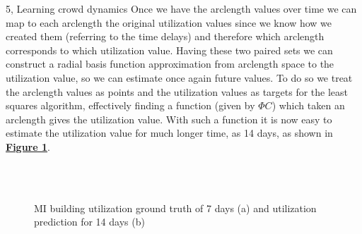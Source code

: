 \documentclass[10pt,a4paper]{article}
\begin{document}
\begin{task}{5, Learning crowd dynamics}
Once we have the arclength values over time we can map to each arclength the original utilization values since we know how we created them (referring to the time delays) and therefore which arclength corresponds to which utilization value. Having these two paired sets we can construct a radial basis function approximation from arclength space to the utilization value, so we can estimate once again future values. To do so we treat the arclength values as points and the utilization values as targets for the least squares algorithm, effectively finding a function (given by $\Phi C$) which taken an arclength gives the utilization value.
With such a function it is now easy to estimate the utilization value for much longer time, as 14 days, as shown in \textbf{\hyperref[fig:task5-14]{Figure \ref{fig:task5-14}}}.

\begin{figure}[ht!]
 \centering
 \\
 \\
 \caption{MI building utilization ground truth of 7 days (a) and utilization prediction for 14 days (b)}%
 \label{fig:task5-14}%
\end{figure}
\end{task}
\end{document}
